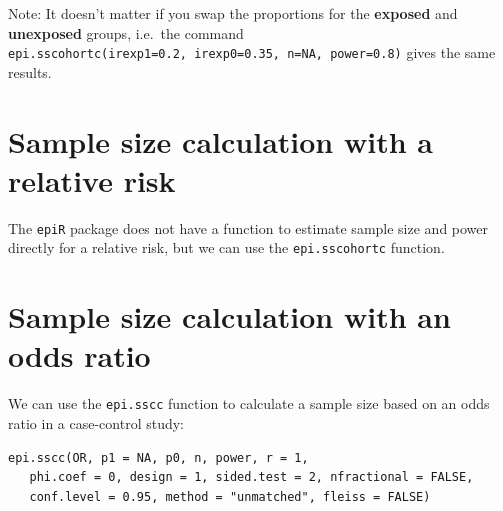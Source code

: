 \documentclass[
]{memoir}
\newenvironment{Shaded}{\begin{snugshade}}{\end{snugshade}}
\newcommand{\AttributeTok}[1]{\textcolor[rgb]{0.77,0.63,0.00}{#1}}
\newcommand{\CommentTok}[1]{\textcolor[rgb]{0.56,0.35,0.01}{\textit{#1}}}
\newcommand{\ConstantTok}[1]{\textcolor[rgb]{0.00,0.00,0.00}{#1}}
\newcommand{\FloatTok}[1]{\textcolor[rgb]{0.00,0.00,0.81}{#1}}
\newcommand{\FunctionTok}[1]{\textcolor[rgb]{0.00,0.00,0.00}{#1}}
\newcommand{\NormalTok}[1]{#1}
\begin{document}
\begin{Shaded}
\end{Shaded}

Note: It doesn't matter if you swap the proportions for the \textbf{exposed} and \textbf{unexposed} groups, i.e.~the command \texttt{epi.sscohortc(irexp1=0.2,\ irexp0=0.35,\ n=NA,\ power=0.8)} gives the same results.

\hypertarget{sample-size-calculation-with-a-relative-risk}{%
\section{Sample size calculation with a relative risk}\label{sample-size-calculation-with-a-relative-risk}}

The \texttt{epiR} package does not have a function to estimate sample size and power directly for a relative risk, but we can use the \texttt{epi.sscohortc} function.

\hypertarget{sample-size-calculation-with-an-odds-ratio}{%
\section{Sample size calculation with an odds ratio}\label{sample-size-calculation-with-an-odds-ratio}}

We can use the \texttt{epi.sscc} function to calculate a sample size based on an odds ratio in a case-control study:

\begin{verbatim}
epi.sscc(OR, p1 = NA, p0, n, power, r = 1, 
   phi.coef = 0, design = 1, sided.test = 2, nfractional = FALSE, 
   conf.level = 0.95, method = "unmatched", fleiss = FALSE)
\end{verbatim}
\end{document}
